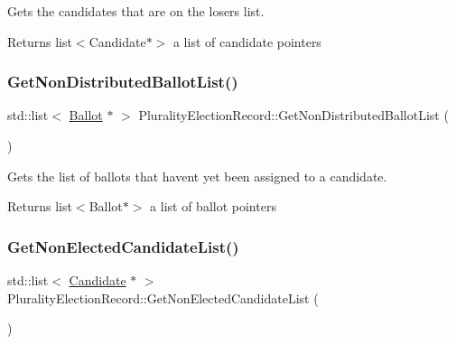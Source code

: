 Gets the candidates that are on the losers list. 

\begin{DoxyReturn}{Returns}
list$<$\+Candidate$\ast$$>$ a list of candidate pointers 
\end{DoxyReturn}
\mbox{\label{classPluralityElectionRecord_a996f0e14812b0b1d510af52ab0c496bf}} 
\subsubsection{\texorpdfstring{Get\+Non\+Distributed\+Ballot\+List()}{GetNonDistributedBallotList()}}
{\footnotesize\ttfamily std\+::list$<$ \hyperlink{classBallot}{Ballot} $\ast$ $>$ Plurality\+Election\+Record\+::\+Get\+Non\+Distributed\+Ballot\+List (\begin{DoxyParamCaption}{ }\end{DoxyParamCaption})}



Gets the list of ballots that haven\textquotesingle{}t yet been assigned to a candidate. 

\begin{DoxyReturn}{Returns}
list$<$\+Ballot$\ast$$>$ a list of ballot pointers 
\end{DoxyReturn}
\mbox{\label{classPluralityElectionRecord_a3767192b33477411922f21ef4474f2e5}} 
\subsubsection{\texorpdfstring{Get\+Non\+Elected\+Candidate\+List()}{GetNonElectedCandidateList()}}
{\footnotesize\ttfamily std\+::list$<$ \hyperlink{classCandidate}{Candidate} $\ast$ $>$ Plurality\+Election\+Record\+::\+Get\+Non\+Elected\+Candidate\+List (\begin{DoxyParamCaption}{ }\end{DoxyParamCaption})}



